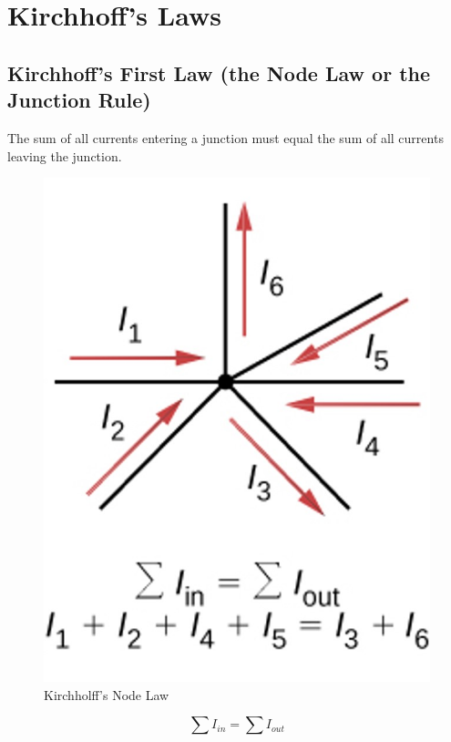 \documentclass[14pt]{memoir}
\begin{document}
\section{Kirchhoff's Laws}

\subsection{Kirchhoff's First Law (the Node Law or the Junction Rule)} 
The sum of all currents entering a junction must equal the sum of all currents leaving the junction.

\begin{figure}[H]
\begin{center}
\includegraphics[scale=0.50]{fig/fig_10_20.jpg}
\caption{Kirchholff's Node Law}
\label{fig:10_20}
\end{center}
\end{figure}

\begin{equation}
\sum I_{in} = \sum I_{out}
\end{equation}
\end{document}
